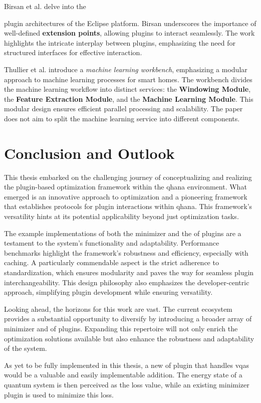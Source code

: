 \documentclass[
  a4paper,  %
  twoside,  %
  bibliography=totoc,
  headsepline,
  cleardoublepage=empty,
  parskip=half,
  draft=false
]{scrbook}
\begin{document}
Birsan et al. \cite{Birsan2005} delve into the {plugin architectures of the Eclipse platform.
Birsan underscores the importance of well-defined \textbf{extension points}, allowing plugins to interact seamlessly.
The work highlights the intricate interplay between plugins, emphasizing the need for structured interfaces for effective interaction.

Thullier et al. \cite{Thullier2021} introduce a \emph{machine learning workbench}, emphasizing a modular approach to machine learning processes for smart homes.
The workbench divides the machine learning workflow into distinct services: the \textbf{Windowing Module}, the \textbf{Feature Extraction Module}, and the \textbf{Machine Learning Module}.
This modular design ensures efficient parallel processing and scalability.
The paper does not aim to split the machine learning service into different components.


\chapter{Conclusion and Outlook}
\label{chap:conclusion}

This thesis embarked on the challenging journey of conceptualizing and realizing the plugin-based optimization framework within the \gls{qhana} environment.
What emerged is an innovative approach to optimization and a pioneering framework that establishes protocols for plugin interactions within \gls{qhana}.
This framework's versatility hints at its potential applicability beyond just optimization tasks.

The example implementations of both the minimizer and the \gls{of} plugins are a testament to the system's functionality and adaptability.
Performance benchmarks highlight the framework's robustness and efficiency, especially with caching.
A particularly commendable aspect is the strict adherence to standardization, which ensures modularity and paves the way for seamless plugin interchangeability.
This design philosophy also emphasizes the developer-centric approach, simplifying plugin development while ensuring versatility.

Looking ahead, the horizons for this work are vast.
The current ecosystem provides a substantial opportunity to diversify by introducing a broader array of minimizer and \gls{of} plugins.
Expanding this repertoire will not only enrich the optimization solutions available but also enhance the robustness and adaptability of the system.

As yet to be fully implemented in this thesis, a new \gls{of} plugin that handles \glspl{vqa} would be a valuable and easily implementable addition.
The energy state of a quantum system is then perceived as the loss value, while an existing minimizer plugin is used to minimize this loss.

}
\end{document}
